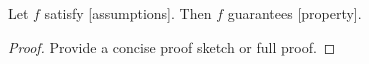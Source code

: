 \begin{theorem}
Let $f$ satisfy [assumptions]. Then $f$ guarantees [property].
\end{theorem}
\begin{proof}
Provide a concise proof sketch or full proof.
\end{proof}

